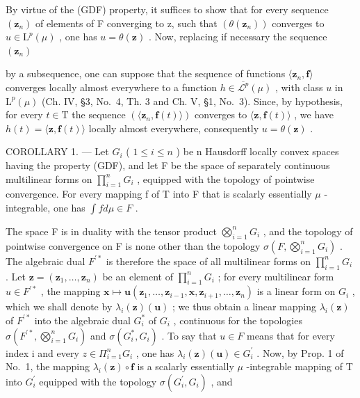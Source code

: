 By virtue of the (GDF) property, it suffices to show that for every sequence \((\mathbf{z}_{n})\) of elements of F converging to z, such that \((\theta(\mathbf{z}_{n}))\) converges to \(u \in \mathrm{L}^{p}(\mu)\) , one has \(u = \theta(\mathbf{z})\) . Now, replacing if necessary the sequence \((\mathbf{z}_{n})\)

by a subsequence, one can suppose that the sequence of functions \(\langle \mathbf{z}_n,\mathbf{f}\rangle\) converges locally almost everywhere to a function \(h\in \overline{\mathcal{L}^p} (\mu)\) , with class \(u\) in \(\mathrm{L}^p (\mu)\) (Ch. IV, §3, No.~4, Th. 3 and Ch. V, §1, No.~3). Since, by hypothesis, for every \(t\in \mathrm{T}\) the sequence \((\langle \mathbf{z}_n,\mathbf{f}(t)\rangle)\) converges to \(\langle \mathbf{z},\mathbf{f}(t)\rangle\) , we have \(h(t) = \langle \mathbf{z},\mathbf{f}(t)\rangle\) locally almost everywhere, consequently \(u = \theta (\mathbf{z})\) .

COROLLARY 1. --- Let \(G_{i}\) ( \(1 \leqslant i \leqslant n\) ) be n Hausdorff locally convex spaces having the property (GDF), and let F be the space of separately continuous multilinear forms on \(\prod_{i=1}^{n} G_{i}\) , equipped with the topology of pointwise convergence. For every mapping f of T into F that is scalarly essentially \(\mu\) -integrable, one has \(\int f d\mu \in F\) .

The space F is in duality with the tensor product \(\bigotimes_{i=1}^{n}G_{i}\) , and the topology of pointwise convergence on F is none other than the topology \(\sigma(F,\bigotimes_{i=1}^{n}G_{i})\) . The algebraic dual \(F^{\prime*}\) is therefore the space of all multilinear forms on \(\prod_{i=1}^{n}G_{i}\) . Let \(\mathbf{z}=(\mathbf{z}_{1},\ldots,\mathbf{z}_{n})\) be an element of \(\prod_{i=1}^{n}G_{i}\) ; for every multilinear form \(u\in F^{\prime*}\) , the mapping \(\mathbf{x}\mapsto\mathbf{u}(\mathbf{z}_{1},\ldots,\mathbf{z}_{i-1},\mathbf{x},\mathbf{z}_{i+1},\ldots,\mathbf{z}_{n})\) is a linear form on \(G_{i}\) , which we shall denote by \(\lambda_{i}(\mathbf{z})(\mathbf{u})\) ; we thus obtain a linear mapping \(\lambda_{i}(\mathbf{z})\) of \(F^{\prime*}\) into the algebraic dual \(G_{i}^{*}\) of \(G_{i}\) , continuous for the topologies \(\sigma(F^{\prime*},\bigotimes_{i=1}^{n}G_{i})\) and \(\sigma(G_{i}^{*},G_{i})\) . To say that \(u\in F\) means that for every index i and every \(z\in\Pi_{i=1}^{n}G_{i}\) , one has \(\lambda_{i}(\mathbf{z})(\mathbf{u})\in G_{i}^{\prime}\) . Now, by Prop. 1 of No.~1, the mapping \(\lambda_{i}(\mathbf{z})\circ\mathbf{f}\) is a scalarly essentially \(\mu\) -integrable mapping of T into \(G_{i}^{\prime}\) equipped with the topology \(\sigma(G_{i}^{\prime},G_{i})\) , and


